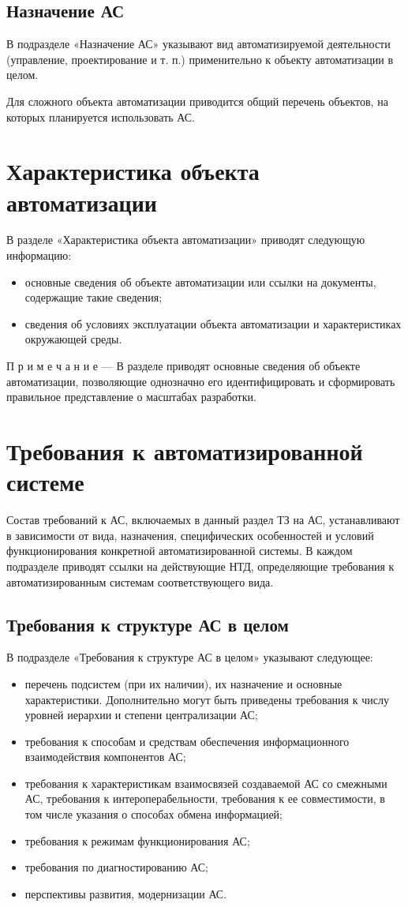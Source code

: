 {\subsection{Назначение АС}
В подразделе «Назначение АС» указывают вид автоматизируемой деятельности (управление, проектирование и т. п.) применительно к объекту автоматизации в целом.

Для сложного объекта автоматизации приводится общий перечень объектов, на которых планируется использовать АС.
\section{Характеристика объекта автоматизации}
В разделе «Характеристика объекта автоматизации» приводят следующую информацию:
\begin{itemize}
  \item основные сведения об объекте автоматизации или ссылки на документы, содержащие такие сведения;
  \item сведения об условиях эксплуатации объекта автоматизации и характеристиках окружающей среды.
\end{itemize}
П р и м е ч а н и е — В разделе приводят основные сведения об объекте автоматизации, позволяющие однозначно его идентифицировать и сформировать правильное представление о масштабах разработки.

\section{Требования к автоматизированной системе}
Состав требований к АС, включаемых в данный раздел ТЗ на АС, устанавливают в зависимости от вида, назначения, специфических особенностей и условий функционирования конкретной автоматизированной системы. В каждом подразделе приводят ссылки на действующие НТД, определяющие требования к автоматизированным системам соответствующего вида.
\subsection{Требования к структуре АС в целом}
В подразделе «Требования к структуре АС в целом» указывают следующее:
\begin{itemize}
  \item перечень подсистем (при их наличии), их назначение и основные характеристики. Дополнительно могут быть приведены требования к числу уровней иерархии и степени централизации АС;
  \item требования к способам и средствам обеспечения информационного взаимодействия компонентов АС;
  \item требования к характеристикам взаимосвязей создаваемой АС со смежными АС, требования к интероперабельности, требования к ее совместимости, в том числе указания о способах обмена информацией;
  \item требования к режимам функционирования АС;
  \item требования по диагностированию АС;
  \item перспективы развития, модернизации АС.
\end{itemize}
}
